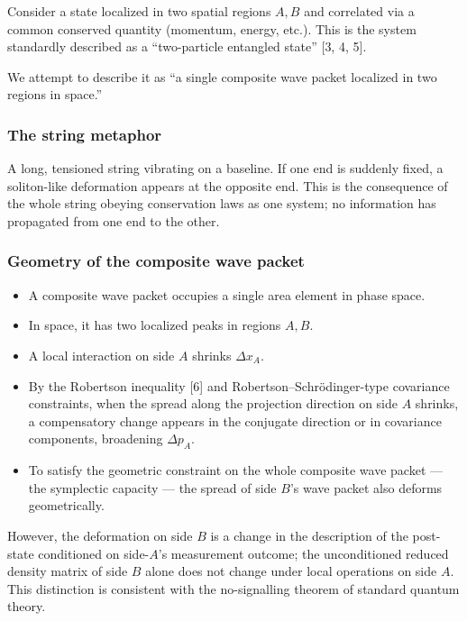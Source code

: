 \documentclass[
]{article}
\providecommand{\tightlist}{%
  \setlength{\itemsep}{0pt}\setlength{\parskip}{0pt}}
\begin{document}
Consider a state localized in two spatial regions \(A, B\) and
correlated via a common conserved quantity (momentum, energy, etc.).
This is the system standardly described as a ``two-particle entangled
state'' {[}3, 4, 5{]}.

We attempt to describe it as ``a single composite wave packet localized
in two regions in space.''

\subsubsection{The string metaphor}\label{the-string-metaphor}

A long, tensioned string vibrating on a baseline. If one end is suddenly
fixed, a soliton-like deformation appears at the opposite end. This is
the consequence of the whole string obeying conservation laws as one
system; no information has propagated from one end to the other.

\subsubsection{Geometry of the composite wave
packet}\label{geometry-of-the-composite-wave-packet}

\begin{itemize}
\tightlist
\item
  A composite wave packet occupies a single area element in phase space.
\item
  In space, it has two localized peaks in regions \(A, B\).
\item
  A local interaction on side \(A\) shrinks \(\Delta x_A\).
\item
  By the Robertson inequality {[}6{]} and Robertson--Schrödinger-type
  covariance constraints, when the spread along the projection direction
  on side \(A\) shrinks, a compensatory change appears in the conjugate
  direction or in covariance components, broadening \(\Delta p_A\).
\item
  To satisfy the geometric constraint on the whole composite wave packet
  --- the symplectic capacity --- the spread of side \(B\)'s wave packet
  also deforms geometrically.
\end{itemize}

However, the deformation on side \(B\) is a change in the description of
the post-state conditioned on side-\(A\)'s measurement outcome; the
unconditioned reduced density matrix of side \(B\) alone does not change
under local operations on side \(A\). This distinction is consistent
with the no-signalling theorem of standard quantum theory.
\end{document}
